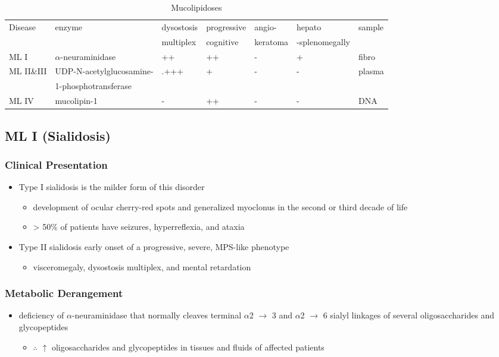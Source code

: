 \documentclass[12pt]{scrartcl}
\begin{document}
\begin{table}[htbp]
\caption{\label{tab:orgbd4e91d}Mucolipidoses}
\centering
\small
\begin{tabular}{lllllll}
Disease & enzyme & dysostosis & progressive & angio- & hepato & sample\\
 &  & multiplex & cognitive & keratoma & -splenomegally & \\
\hline
ML I & \(\alpha\)-neuraminidase & ++ & ++ & - & + & fibro\\
ML II\&III & UDP-N-acetylglucosamine- & .+++ & + & - & - & plasma\\
 & 1-phosphotransferase &  &  &  &  & \\
ML IV & mucolipin-1 & - & ++ & - & - & DNA\\
\end{tabular}
\end{table}

\subsection{ML I (Sialidosis)}
\label{sec:orge20d5ab}
\subsubsection{Clinical Presentation}
\label{sec:orgaba51f3}
\begin{itemize}
\item Type I sialidosis is the milder form of this disorder
\begin{itemize}
\item development of ocular cherry-red spots and generalized
myoclonus in the second or third decade of life
\item \textgreater{} 50\% of patients have seizures, hyperreflexia, and ataxia
\end{itemize}

\item Type II sialidosis early onset of a progressive, severe, MPS-like
phenotype
\begin{itemize}
\item visceromegaly, dysostosis multiplex, and mental retardation
\end{itemize}
\end{itemize}

\subsubsection{Metabolic Derangement}
\label{sec:org5cd3bc2}
\begin{itemize}
\item deficiency of \(\alpha\)-neuraminidase that normally cleaves terminal
\(\alpha\)2 \(\to\) 3 and \(\alpha\)2 \(\to\) 6 sialyl linkages of several
oligosaccharides and glycopeptides
\begin{itemize}
\item \(\therefore\) \(\uparrow\) oligosaccharides and glycopeptides in tissues
and fluids of affected patients
\end{itemize}
\end{itemize}
\end{document}
